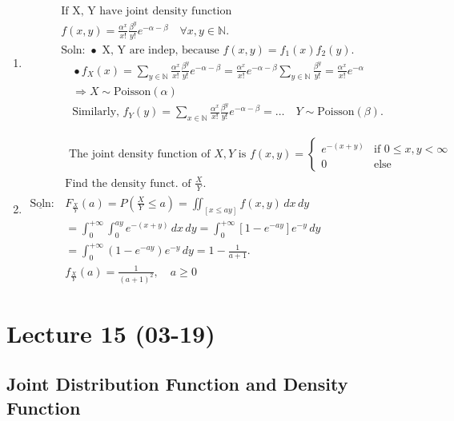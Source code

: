 \begin{example}[]{}
 \begin{enumerate}[label=\circled{\arabic*}] 
\item  \begin{align*}
    &\text{If X, Y have joint density function}\\
    &f(x,y) = \frac{\alpha^x}{x!}\frac{\beta^y}{y!}e^{-\alpha-\beta} \quad \forall x,y \in \mathbb{N}.\\
    &\text{Soln: } \bullet \text{ X, Y are indep, because } f(x,y) = f_1(x)f_2(y).\\
    &\quad \bullet f_X(x) = \sum_{y \in \mathbb{N}} \frac{\alpha^x}{x!}\frac{\beta^y}{y!}e^{-\alpha-\beta} = \frac{\alpha^x}{x!}e^{-\alpha-\beta}\sum_{y \in \mathbb{N}}\frac{\beta^y}{y!} = \frac{\alpha^x}{x!}e^{-\alpha}\\
    &\quad \Rightarrow X \sim \text{Poisson}(\alpha)\\
    &\quad \text{Similarly, } f_Y(y) = \sum_{x \in \mathbb{N}} \frac{\alpha^x}{x!}\frac{\beta^y}{y!}e^{-\alpha-\beta} = \ldots \quad Y \sim \text{Poisson}(\beta).
    \end{align*}
 \item \begin{align*}
     &\text{ The joint density function of } X, Y \text{ is } f(x,y) = 
    \begin{cases}
    e^{-(x+y)} & \text{if } 0 \leq x, y < \infty\\
    0 & \text{else}
    \end{cases}\\
    &\text{Find the density funct. of } \frac{X}{Y}.\\
    \underline{\text{Soln}}: & F_{\frac{X}{Y}}(a) = P\left(\frac{X}{Y} \leq a\right) = \iint_{[x \leq ay]} f(x,y) \, dx \, dy\\
    &= \int_0^{+\infty} \int_0^{ay} e^{-(x+y)} \, dx \, dy = \int_0^{+\infty} [1-e^{-ay}]e^{-y} \, dy\\
    &= \int_0^{+\infty} (1-e^{-ay})e^{-y} \, dy = 1-\frac{1}{a+1}.\\
    &f_{\frac{X}{Y}}(a) = \frac{1}{(a+1)^2}, \quad a \geq 0
    \end{align*}
 \end{enumerate}
\end{example}
\section{Lecture 15 (03-19)}
\subsection{Joint Distribution Function and Density Function}

